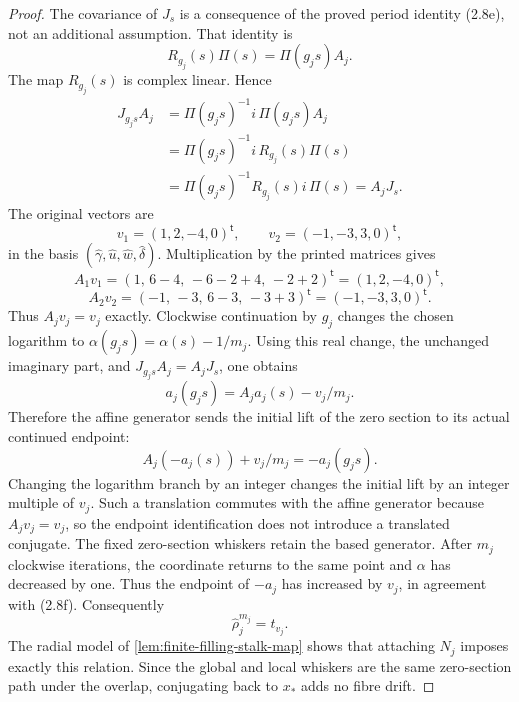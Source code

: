 \begin{proof}
The covariance of \(J_s\) is a consequence of the proved period
identity (2.8e), not an additional assumption.  That identity is
\[
 R_{g_j}(s)\Pi(s)=\Pi(g_js)A_j.
\]
The map \(R_{g_j}(s)\) is complex linear.  Hence
\[
 \begin{split}
 J_{g_js}A_j
 &=\Pi(g_js)^{-1}i\,\Pi(g_js)A_j\\
 &=\Pi(g_js)^{-1}i\,R_{g_j}(s)\Pi(s)\\
 &=\Pi(g_js)^{-1}R_{g_j}(s)i\,\Pi(s)
 =A_jJ_s.
 \end{split}
\]
The original vectors are
\[
 v_1=(1,2,-4,0)^{\mathsf t},\qquad
 v_2=(-1,-3,3,0)^{\mathsf t},
\]
in the basis
\((\widehat\gamma,\widehat u,\widehat w,\widehat\delta)\).
Multiplication by the printed matrices gives
\[
 A_1v_1=(1,\,6-4,\,-6-2+4,\,-2+2)^{\mathsf t}
        =(1,2,-4,0)^{\mathsf t},
\]
\[
 A_2v_2=(-1,\,-3,\,6-3,\,-3+3)^{\mathsf t}
        =(-1,-3,3,0)^{\mathsf t}.
\]
Thus \(A_jv_j=v_j\) exactly.  Clockwise continuation by \(g_j\)
changes the chosen logarithm to
\(\alpha(g_js)=\alpha(s)-1/m_j\).  Using this real change, the
unchanged imaginary part, and \(J_{g_js}A_j=A_jJ_s\), one obtains
\[
 a_j(g_js)=A_ja_j(s)-v_j/m_j.
\]
Therefore the affine generator sends the initial lift of the
zero section to its actual continued endpoint:
\[
 A_j(-a_j(s))+v_j/m_j=-a_j(g_js).
\]
Changing the logarithm branch by an integer changes the initial
lift by an integer multiple of \(v_j\).  Such a translation
commutes with the affine generator because \(A_jv_j=v_j\), so the
endpoint identification does not introduce a translated conjugate.
The fixed zero-section whiskers retain the based generator.
After \(m_j\) clockwise iterations, the coordinate returns to the
same point and \(\alpha\) has decreased by one.  Thus the endpoint
of \(-a_j\) has increased by \(v_j\), in agreement with (2.8f).
Consequently
\[
 \widehat\rho_j^{m_j}=t_{v_j}.
 \tag{5.23b}
\]
The radial model of \cref{lem:finite-filling-stalk-map} shows that attaching
\(N_j\) imposes exactly this relation.  Since the global and local whiskers
are the same zero-section path under the overlap, conjugating back to
\(x_*\) adds no fibre drift.


\end{proof}
